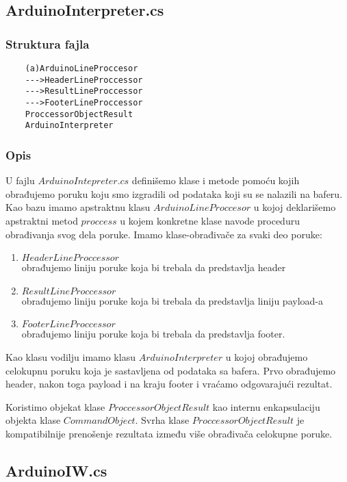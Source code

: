 \documentclass[a4paper]{extarticle}
\begin{document}
	\subsection{ArduinoInterpreter.cs}
	\label{a2}
	
	\subsubsection*{Struktura fajla}
	\begin{verbatim}
	(a)ArduinoLineProccesor
	--->HeaderLineProccessor
	--->ResultLineProccessor
	--->FooterLineProccessor
	ProccessorObjectResult
	ArduinoInterpreter
	\end{verbatim}
	
	\subsubsection*{Opis}
	
	U fajlu $ArduinoIntepreter.cs$ definišemo klase i metode pomoću kojih obrađujemo poruku koju smo izgradili od podataka koji su se nalazili na baferu.
	Kao bazu imamo apstraktnu klasu $ArduinoLineProccesor$ u kojoj deklarišemo apstraktni metod $proccess$ u kojem konkretne klase navode proceduru obrađivanja svog dela poruke.
	Imamo klase-obrađivače za svaki deo poruke:
	\begin{enumerate}
		\item $HeaderLineProccessor$ \\ obrađujemo liniju poruke koja bi trebala da predstavlja header
		\item $ResultLineProccessor$ \\ obrađujemo liniju poruke koja bi trebala da predstavlja liniju payload-a
		\item $FooterLineProccessor$ \\obrađujemo liniju poruke koja bi trebala da predstavlja footer.
	\end{enumerate} 

	Kao klasu vodilju imamo klasu $ArduinoInterpreter$ u kojoj obrađujemo celokupnu poruku koja je sastavljena od podataka sa bafera.
	Prvo obrađujemo header, nakon toga payload i na kraju footer i vraćamo odgovarajući rezultat.
	
	Koristimo objekat klase $ProccessorObjectResult$ kao internu enkapsulaciju objekta klase $CommandObject$. Svrha klase $ProccessorObjectResult$ je kompatibilnije prenošenje rezultata između više obrađivača celokupne poruke.
	
	\subsection{ArduinoIW.cs}
	\label{ArduinoIWSecion}
	
\end{document}
